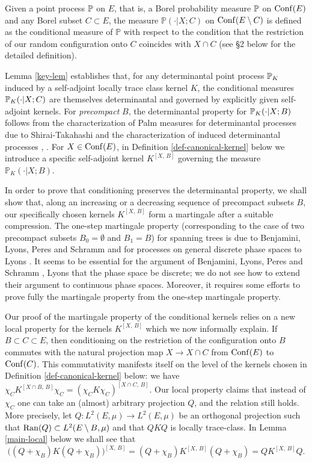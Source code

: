 \documentclass[12pt]{paper}
\numberwithin{theorem}{section}
\numberwithin{figure}{section}
\numberwithin{equation}{section}
\begin{document}
Given a point process $\mathbb{P}$ on $E$, that is, a Borel probability measure $\mathbb{P}$ on $\mathrm{Conf}(E)$ and any Borel subset $C\subset E$, the measure $\mathbb{P}(\cdot | X; C)$ on $\mathrm{Conf}(E\setminus C)$ is defined as the conditional measure of $\mathbb{P}$ with respect to the condition that the restriction of our random configuration onto $C$ coincides with $X\cap C$ (see \S 2 below for the detailed definition).


Lemma \ref{key-lem} establishes  that, for any determinantal point process $\mathbb{P}_K$ induced by a self-adjoint locally trace class kernel $K$,  the conditional measures $\mathbb{P}_K(\cdot | X; C)$ are themselves determinantal and governed by  explicitly given  self-adjoint kernels.
 For {\it precompact} $B$, the determinantal property for $\mathbb{P}_K(\cdot | X; B)$ follows from the characterization of Palm measures for determinantal processes due to Shirai-Takahashi \cite{ST-palm} and the characterization of induced determinantal processes \cite{Buf-umn}, \cite{Buf-inf}.
For $X\in \mathrm{Conf}(E)$,
in Definition \ref{def-canonical-kernel} below we introduce  a specific
self-adjoint  kernel $K^{[X, \, B]}$ governing the measure $\mathbb{P}_K(\cdot |X; B)$.


In order to prove that conditioning preserves the determinantal property, we shall show that, along an increasing or a decreasing sequence of precompact subsets $B$,  our specifically chosen kernels $K^{[X, \, B]}$ form a martingale after a suitable compression.
The one-step martingale property (corresponding to the case of two precompact subsets $B_0 = \emptyset$ and $B_1 = B$) for spanning trees is due to Benjamini, Lyons, Peres and Schramm
 \cite{BLPS} and  for processes on general discrete phase spaces to Lyons \cite{DPP-L}. It seems to be essential for the argument of Benjamini, Lyons, Peres and Schramm  \cite{BLPS}, Lyons \cite{DPP-L} that the phase space be discrete;
we do not see how to extend their argument to continuous phase spaces. Moreover, it requires some efforts to prove fully the martingale property from the one-step martingale property.

Our proof of the martingale property of the conditional kernels relies on a new local property for the kernels $K^{[X, \, B]}$ which we now informally explain.
 If $B\subset C\subset E$, then conditioning
on the restriction of the configuration onto $B$ commutes with the natural projection map $X\to X\cap C$ from $\mathrm{Conf}(E)$ to $\mathrm{Conf}(C)$. This commutativity manifests itself on the level of the  kernels chosen in Definition \ref{def-canonical-kernel} below:
we have
$
\chi_CK^{[X\cap B,\, B]}\chi_C=(\chi_CK\chi_C)^{[X\cap C, \, B]}.
$
Our local property claims that instead of $\chi_C$
one can take an (almost) arbitrary projection $Q$, and the relation still holds.
More precisely, let  $Q: L^2(E, \mu) \rightarrow L^2(E,\mu)$ be an orthogonal projection such that  $\mathrm{Ran}(Q) \subset L^2(E\setminus B, \mu)$ and
that $QKQ$  is locally trace-class. In Lemma \ref{main-local} below we shall see that
\begin{equation}\label{local-kernel}
\Big((Q + \chi_B)K (Q+\chi_B)\Big)^{[X, \, B]} = (Q  + \chi_B )K^{[X, \, B]} (Q  + \chi_B) =  Q K^{[X, \, B]} Q.
\end{equation}
\end{document}
